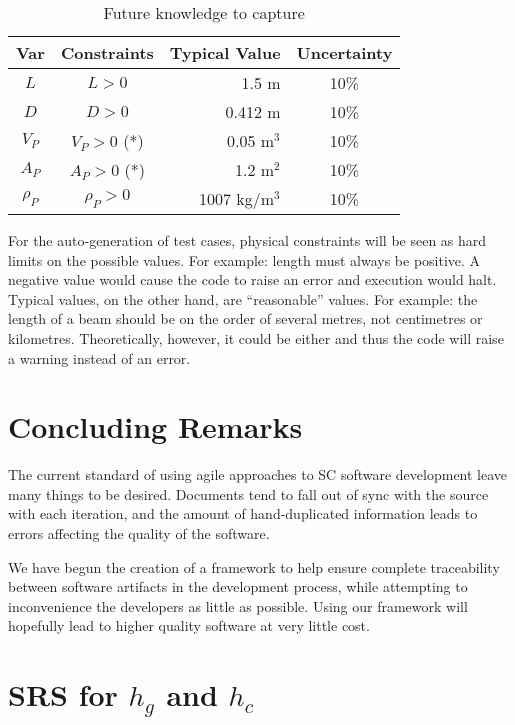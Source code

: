 \documentclass{sig-alternate-05-2015}
\begin{document}
\begin{table} \label{tab:pcm}
\centering
\caption{Future knowledge to capture}
\begin{tabular}{|c|c|r|c|} \hline
\textbf{Var} & \textbf{Constraints} & \textbf{Typical Value} & \textbf{Uncertainty}\\ \hline
$L$ & $L > 0$ & 1.5 m & 10\% \\ \hline
$D$ & $D > 0$ & 0.412 m & 10\% \\ \hline
$V_P$ & $V_P > 0$ (*)	& 0.05 m$^3$	& 10\% \\ \hline
$A_P$ & $A_P > 0$ (*)	& 1.2 m$^2$	& 10\% \\ \hline
$\rho_P$ & $\rho_P > 0$	& 1007 kg/m$^3$	& 10\% \\
\hline\end{tabular}
\end{table}

For the auto-generation of test cases, physical constraints will be seen as hard
limits on the possible values. For example: length must always be positive.  A
negative value would cause the code to raise an error and execution would
halt. Typical values, on the other hand, are ``reasonable'' values. For example:
the length of a beam should be on the order of several metres, not centimetres
or kilometres. Theoretically, however, it could be either and thus the code will
raise a warning instead of an error.

    
\section{Concluding Remarks} \label{sec:conclusion}

The current standard of using agile approaches to SC software development leave
many things to be desired. Documents tend to fall out of sync with the source
with each iteration, and the amount of hand-duplicated information leads to
errors affecting the quality of the software.

We have begun the creation of a framework to help ensure complete traceability
between software artifacts in the development process, while attempting to
inconvenience the developers as little as possible. Using our framework will
hopefully lead to higher quality software at very little cost.



  
\appendix
\section{SRS for $h_g$ and $h_c$} \label{app:srs}
\end{document}
